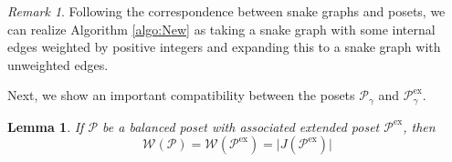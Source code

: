 \documentclass[12pt, letterpaper,table]{amsart}
\newtheorem{lemma}[theorem]{Lemma}
\theoremstyle{remark}
\newtheorem{remark}[theorem]{Remark}
\newcommand{\calP}{\mathcal{P}}
\newcommand{\exx}{\mathrm{ex}}
\begin{document}
\begin{remark}
Following the correspondence between snake graphs and posets, we can realize Algorithm \ref{algo:New} as taking a snake graph with some internal edges weighted by positive integers and expanding this to a snake graph with unweighted edges. 

\begin{center}
\end{center}
\end{remark}


Next, we show an important compatibility between the posets $\calP_\gamma$ and $\calP_\gamma^\exx$. 


\begin{lemma}\label{lem:ExtendPoset}
If $\calP$ be a balanced poset with associated extended poset $\calP^\exx$, then
\[
\mathcal{W}(\calP) = \mathcal{W}(\calP^\exx) = \vert J(\calP^\exx) \vert
\]
\end{lemma}
\end{document}
